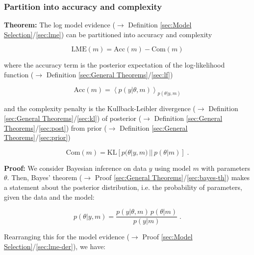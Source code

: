 \documentclass[a4paper,12pt,twoside]{book}
\begin{document}
\subsubsection[\textbf{Partition into accuracy and complexity}]{Partition into accuracy and complexity} \label{sec:lme-anc}
\setcounter{equation}{0}

\textbf{Theorem:} The log model evidence ($\rightarrow$ Definition \ref{sec:Model Selection}/\ref{sec:lme}) can be partitioned into accuracy and complexity

\begin{equation} \label{eq:lme-anc-LME}
\mathrm{LME}(m) = \mathrm{Acc}(m) - \mathrm{Com}(m)
\end{equation}

where the accuracy term is the posterior expectation of the log-likelihood function ($\rightarrow$ Definition \ref{sec:General Theorems}/\ref{sec:lf})

\begin{equation} \label{eq:lme-anc-Acc}
\mathrm{Acc}(m) = \left\langle p(y|\theta,m) \right\rangle_{p(\theta|y,m)}
\end{equation}

and the complexity penalty is the Kullback-Leibler divergence ($\rightarrow$ Definition \ref{sec:General Theorems}/\ref{sec:kl}) of posterior ($\rightarrow$ Definition \ref{sec:General Theorems}/\ref{sec:post}) from prior ($\rightarrow$ Definition \ref{sec:General Theorems}/\ref{sec:prior})

\begin{equation} \label{eq:lme-anc-Com}
\mathrm{Com}(m) = \mathrm{KL} \left[ p(\theta|y,m) \, || \, p(\theta|m) \right] \; .
\end{equation}


\vspace{1em}
\textbf{Proof:} We consider Bayesian inference on data $y$ using model $m$ with parameters $\theta$. Then, Bayes' theorem ($\rightarrow$ Proof \ref{sec:General Theorems}/\ref{sec:bayes-th}) makes a statement about the posterior distribution, i.e. the probability of parameters, given the data and the model:

\begin{equation} \label{eq:lme-anc-AnC-s1}
p(\theta|y,m) = \frac{p(y|\theta,m) \, p(\theta|m)}{p(y|m)} \; .
\end{equation}

Rearranging this for the model evidence ($\rightarrow$ Proof \ref{sec:Model Selection}/\ref{sec:lme-der}), we have:
\end{document}
